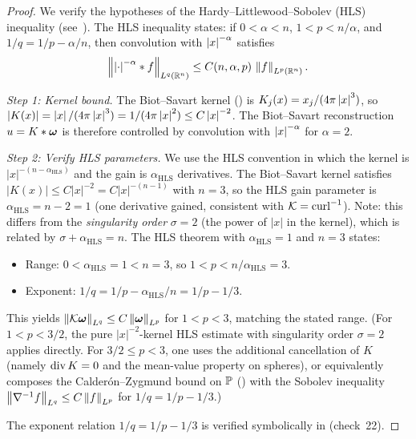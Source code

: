 \begin{proof}
  We verify the hypotheses of the Hardy--Littlewood--Sobolev (HLS) inequality
  (see~\cite[Ch.\,V, Thm.\,1]{stein1970}).
  The HLS inequality states: if $0 < \alpha < n$, $1 < p < n/\alpha$, and
  $1/q = 1/p - \alpha/n$, then convolution with $\left\lvert x \right\rvert^{-\alpha}$ satisfies
  \[
    \left\lVert \left\lvert \cdot \right\rvert^{-\alpha} * f \right\rVert_{L^{q}(\mathbb{R}^n)}
    \leq C(n,\alpha,p)\,\left\lVert f \right\rVert_{L^{p}(\mathbb{R}^n)}.
  \]

  \emph{Step 1: Kernel bound.}
  The Biot--Savart kernel () is
  $K_j(x) = x_j/(4\pi\left\lvert x \right\rvert^3)$, so
  $\left\lvert K(x) \right\rvert = \left\lvert x \right\rvert/(4\pi\left\lvert x \right\rvert^3) = 1/(4\pi\left\lvert x \right\rvert^2)
  \leq C\left\lvert x \right\rvert^{-2}$.
  The Biot--Savart reconstruction $u = K * \boldsymbol{\omega}$ is therefore controlled by
  convolution with $\left\lvert x \right\rvert^{-\alpha}$ for $\alpha = 2$.

  \emph{Step 2: Verify HLS parameters.}
  We use the HLS convention in which the kernel is $|x|^{-(n-\alpha_{\mathrm{HLS}})}$
  and the gain is $\alpha_{\mathrm{HLS}}$ derivatives.  The Biot--Savart kernel satisfies
  $|K(x)| \leq C|x|^{-2} = C|x|^{-(n-1)}$ with $n = 3$, so the HLS gain parameter is
  $\alpha_{\mathrm{HLS}} = n - 2 = 1$ (one derivative gained, consistent with $\mathcal{K} =
  \operatorname{curl}^{-1}$).  Note: this differs from the \emph{singularity order} $\sigma = 2$
  (the power of $|x|$ in the kernel), which is related by $\sigma + \alpha_{\mathrm{HLS}}
  = n$.  The HLS theorem with $\alpha_{\mathrm{HLS}} = 1$ and $n = 3$ states:
  \begin{itemize}
    \item Range: $0 < \alpha_{\mathrm{HLS}} = 1 < n = 3$, so $1 < p < n/\alpha_{\mathrm{HLS}}
      = 3$.  \checkmark
    \item Exponent: $1/q = 1/p - \alpha_{\mathrm{HLS}}/n = 1/p - 1/3$.
  \end{itemize}
  This yields $\left\lVert \mathcal{K}\boldsymbol{\omega} \right\rVert_{L^{q}} \leq C\left\lVert \boldsymbol{\omega} \right\rVert_{L^{p}}$ for $1 < p < 3$,
  matching the stated range.  (For $1 < p < 3/2$, the pure $|x|^{-2}$-kernel HLS
  estimate with singularity order $\sigma = 2$ applies directly.  For $3/2 \leq p < 3$,
  one uses the additional cancellation of $K$ (namely $\operatorname{div} K = 0$ and the
  mean-value property on spheres), or equivalently composes the Calder\'{o}n--Zygmund
  bound on $\mathbb{P}$ () with the Sobolev inequality
  $\left\lVert \nabla^{-1}f \right\rVert_{L^{q}} \leq C\left\lVert f \right\rVert_{L^{p}}$ for $1/q = 1/p - 1/3$.)

  The exponent relation $1/q = 1/p - 1/3$ is verified symbolically in
   (check~22).
\end{proof}


